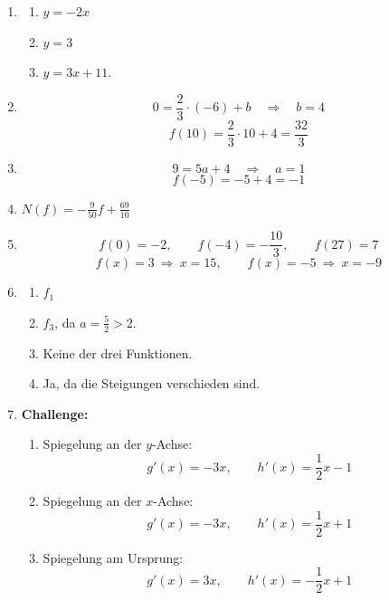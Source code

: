 \begin{enumerate}
    \item
          \begin{enumerate}

              \item \(y=-2x\)
              \item \(y=3\)
              \item \(y=3x+11\).
          \end{enumerate}

    \item
          \[
              0=\frac23\cdot(-6)+b
              \quad\Rightarrow\quad b=4
          \]
          \[
              f(10)=\frac23\cdot10+4=\frac{32}{3}
          \]

    \item
          \[
              9=5a+4
              \quad\Rightarrow\quad a=1
          \]
          \[
              f(-5)=-5+4=-1
          \]
    \item \(N(f)=-\frac{9}{50}f+\frac{69}{10}\)
    \item
          \[
              f(0)=-2,\qquad
              f(-4)=-\frac{10}{3},\qquad
              f(27)=7
          \]
          \[
              f(x)=3\ \Rightarrow\ x=15,
              \qquad
              f(x)=-5\ \Rightarrow\ x=-9
          \]

    \item
          \begin{enumerate}
              \item \(f_1\)
              \item \(f_3\), da \(a=\frac52>2\).
              \item Keine der drei Funktionen.
              \item Ja, da die Steigungen verschieden sind.
          \end{enumerate}

    \item \textbf{Challenge:}
          \begin{enumerate}
              \item Spiegelung an der \(y\)-Achse:
                    \[
                        g'(x)=-3x,\qquad
                        h'(x)=\frac12x-1
                    \]

              \item Spiegelung an der \(x\)-Achse:
                    \[
                        g'(x)=-3x,\qquad
                        h'(x)=\frac12x+1
                    \]

              \item Spiegelung am Ursprung:
                    \[
                        g'(x)=3x,\qquad
                        h'(x)=-\frac12x+1
                    \]
          \end{enumerate}
\end{enumerate}









